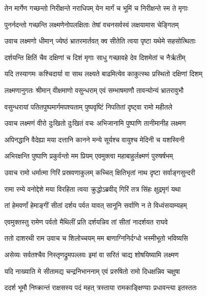 \twolineshloka
{तेन मार्गेण गच्छन्तो निरीक्षन्ते नराधिपम्}
{येन मार्गं च भूमिं च निरीक्षन्ते स्म ते मृगाः} %

\twolineshloka
{पुनर्नदन्तो गच्छन्ति लक्ष्मणेनोपलक्षिताः}
{तेषां वचनसर्वस्वं लक्षयामास चेङ्गितम्} %

\twolineshloka
{उवाच लक्ष्मणो धीमान् ज्येष्ठं भ्रातरमार्तवत्}
{क्व सीतेति त्वया पृष्टा यथेमे सहसोत्थिताः} %

\twolineshloka
{दर्शयन्ति क्षितिं चैव दक्षिणां च दिशं मृगाः}
{साधु गच्छावहे देव दिशमेतां च नैर्ऋतीम्} %

\twolineshloka
{यदि तस्यागमः कश्चिदार्या वा साथ लक्ष्यते}
{बाढमित्येव काकुत्स्थः प्रस्थितो दक्षिणां दिशम्} %

\twolineshloka
{लक्ष्मणानुगतः श्रीमान् वीक्षमाणो वसुन्धराम्}
{एवं सम्भाषमाणौ तावन्योन्यं भ्रातरावुभौ} %

\twolineshloka
{वसुन्धरायां पतितपुष्पमार्गमपश्यताम्}
{पुष्पवृष्टिं निपतितां दृष्ट्वा रामो महीतले} %

\twolineshloka
{उवाच लक्ष्मणं वीरो दुःखितो दुःखितं वचः}
{अभिजानामि पुष्पाणि तानीमानीह लक्ष्मण} %

\twolineshloka
{अपिनद्धानि वैदेह्या मया दत्तानि कानने}
{मन्ये सूर्यश्च वायुश्च मेदिनी च यशस्विनी} %

\twolineshloka
{अभिरक्षन्ति पुष्पाणि प्रकुर्वन्तो मम प्रियम्}
{एवमुक्त्वा महाबाहुर्लक्ष्मणं पुरुषर्षभम्} %

\twolineshloka
{उवाच रामो धर्मात्मा गिरिं प्रस्रवणाकुलम्}
{कच्चित् क्षितिभृतां नाथ दृष्टा सर्वाङ्गसुन्दरी} %

\twolineshloka
{रामा रम्ये वनोद्देशे मया विरहिता त्वया}
{क्रुद्धोऽब्रवीद् गिरिं तत्र सिंहः क्षुद्रमृगं यथा} %

\twolineshloka
{तां हेमवर्णां हेमाङ्गीं सीतां दर्शय पर्वत}
{यावत् सानूनि सर्वाणि न ते विध्वंसयाम्यहम्} %

\twolineshloka
{एवमुक्तस्तु रामेण पर्वतो मैथिलीं प्रति}
{दर्शयन्निव तां सीतां नादर्शयत राघवे} %

\twolineshloka
{ततो दाशरथी राम उवाच च शिलोच्चयम्}
{मम बाणाग्निनिर्दग्धो भस्मीभूतो भविष्यसि} %

\twolineshloka
{असेव्यः सर्वतश्चैव निस्तृणद्रुमपल्लवः}
{इमां वा सरितं चाद्य शोषयिष्यामि लक्ष्मण} %

\twolineshloka
{यदि नाख्याति मे सीतामद्य चन्द्रनिभाननाम्}
{एवं प्ररुषितो रामो दिधक्षन्निव चक्षुषा} %

\twolineshloka
{ददर्श भूमौ निष्क्रान्तं राक्षसस्य पदं महत्}
{त्रस्ताया रामकाङ्क्षिण्याः प्रधावन्त्या इतस्ततः} %

